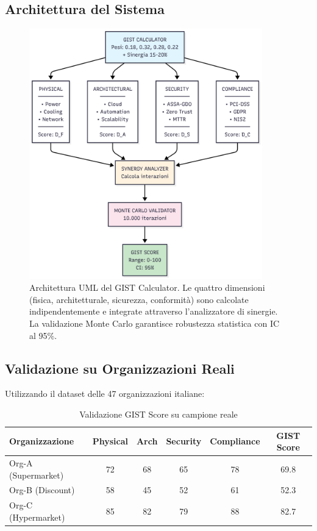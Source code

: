 \subsection{\texorpdfstring{Architettura del Sistema}{5.4.1 - Architettura del Sistema}}
\begin{figure}[!ht]
    \centering
    \includegraphics[width=0.9\textwidth]{thesis_figures/cap5/UML.png}
    \caption{Architettura UML del GIST Calculator. Le quattro dimensioni 
    (fisica, architetturale, sicurezza, conformità) sono calcolate 
    indipendentemente e integrate attraverso l'analizzatore di sinergie. 
    La validazione Monte Carlo garantisce robustezza statistica con 
    IC al 95\%.}
    \label{fig:gist-uml}
\end{figure}

\subsection{\texorpdfstring{Validazione su Organizzazioni Reali}{5.4.2 - Validazione su Organizzazioni Reali}}
Utilizzando il dataset delle 47 organizzazioni italiane:

\begin{table}[htbp]
\caption{Validazione GIST Score su campione reale}
\small
\sffamily
\begin{tabularx}{\textwidth}{Xccccc}
\toprule
\textbf{Organizzazione} & \textbf{Physical} & \textbf{Arch} & \textbf{Security} & \textbf{Compliance} & \textbf{GIST Score} \\
\midrule
Org-A (Supermarket) & 72 & 68 & 65 & 78 & 69.8 \\
Org-B (Discount) & 58 & 45 & 52 & 61 & 52.3 \\
Org-C (Hypermarket) & 85 & 82 & 79 & 88 & 82.7 \\
\bottomrule
\end{tabularx}
\end{table}

